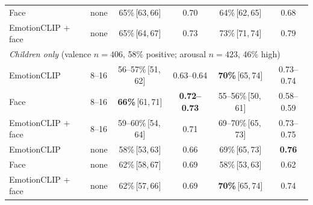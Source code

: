 \documentclass[11pt]{article}
\newcommand{\best}[1]{\textbf{#1}}
\newcommand{\ci}[2]{\,[#1,\,#2]}
\begin{document}
\begin{table}[!htbp]
\begin{tabular}{llcccc}
Face & none & 65\%\ci{63}{66} & 0.70 & 64\%\ci{62}{65} & 0.68 \\
EmotionCLIP + face & none & 65\%\ci{64}{67} & 0.73 & 73\%\ci{71}{74} & 0.79 \\
\midrule
\multicolumn{6}{l}{\emph{Children only} (valence $n{=}406$, 58\% positive; arousal $n{=}423$, 46\% high)} \\
EmotionCLIP & 8--16 & 56--57\%\ci{51}{62} & 0.63--0.64 & \best{70\%}\ci{65}{74} & 0.73--0.74 \\
Face & 8--16 & \best{66\%}\ci{61}{71} & \best{0.72--0.73} & 55--56\%\ci{50}{61} & 0.58--0.59 \\
EmotionCLIP + face & 8--16 & 59--60\%\ci{54}{64} & 0.71 & 69--70\%\ci{65}{73} & 0.73--0.75 \\
EmotionCLIP & none & 58\%\ci{53}{63} & 0.66 & 69\%\ci{65}{73} & \best{0.76} \\
Face & none & 62\%\ci{58}{67} & 0.69 & 58\%\ci{53}{63} & 0.62 \\
EmotionCLIP + face & none & 62\%\ci{57}{66} & 0.69 & \best{70\%}\ci{65}{74} & 0.74 \\
\bottomrule
\end{tabular}
\end{table}
\end{document}
